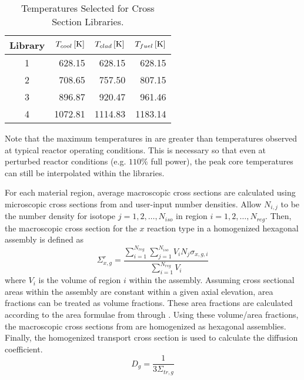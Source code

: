   \begin{table}
    \caption{Temperatures Selected for Cross Section Libraries.}
    \label{tab:xstemps}
    \begin{center}
      \begin{tabular}{crrr}
        \toprule
        Library & $T_{cool} \left[\text{{K}}\right]$ & $T_{clad} \left[\text{{K}}\right]$ & 
          $T_{fuel} \left[\text{{K}}\right]$ \\
        \midrule
        1 & 628.15 & 628.15 & 628.15  \\
        2 & 708.65 & 757.50 & 807.15  \\
        3 & 896.87 & 920.47 & 961.46 \\
        4 & 1072.81 & 1114.83 & 1183.14 \\
        \bottomrule
      \end{tabular}
    \end{center}
  \end{table}

  Note that the maximum temperatures in  are greater than 
  temperatures observed at typical reactor operating conditions. This is
  necessary so that even at perturbed reactor conditions (e.g. $110\%$ full
  power), the peak core temperatures can still be interpolated within the
  libraries.

  For each material region, average macroscopic cross sections are calculated
  using microscopic cross sections from \mcc and user-input number densities.
  Allow $N_{i,j}$ to be the number density for isotope ${j=1,2,\ldots,N_{iso}}$
  in region ${i=1,2,\ldots,N_{reg}}$.  Then, the macroscopic cross section for
  the $x$ reaction type in a homogenized hexagonal assembly is defined as
  \begin{equation}
    \label{eq:xs_homog}
    \Sigma_{x,g}^r = \frac{\sum_{i=1}^{N_{reg}} \sum_{j=1}^{N_{iso}} V_i N_{j} 
      \sigma_{x,g,i}} {\sum_{i=1}^{N_{reg}}V_i}
  \end{equation}
  where $V_i$ is the volume of region $i$ within the assembly. Assuming cross
  sectional areas within the assembly are constant within a given axial
  elevation, area fractions can be treated as volume fractions. These area
  fractions are calculated according to the area formulae from
   through . Using these volume/area
  fractions, the macroscopic cross sections from  are
  homogenized as hexagonal assemblies. Finally, the homogenized transport cross
  section is used to calculate the diffusion coefficient.
  \begin{equation}
    D_g = \frac{1}{3 \Sigma_{tr,g}}
  \end{equation}


